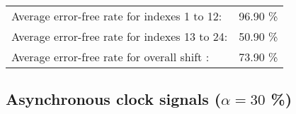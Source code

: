 \begin{table}[h]
\begin{center}
\begin{tabular}{|c|c|c|c|c|}
\end{tabular}


\flushleft
\begin{tabular}{l l}
Average error-free rate for indexes  1 to 12: &  96.90 \% \\
Average error-free rate for indexes 13 to 24: &  50.90 \% \\
Average error-free rate for overall shift   : &  73.90 \% \\

\end{tabular}


\end{center}
\end{table}


\pagebreak
\subsection{Asynchronous clock signals ($\alpha=30$ \%)}

